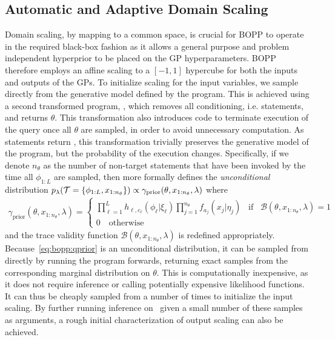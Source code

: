 
\subsection{Automatic and Adaptive Domain Scaling}
\label{sec:bopp:domain}

Domain scaling, by mapping to a common space, is crucial for BOPP to operate in the required black-box fashion as it allows a general purpose and problem independent hyperprior to be placed on the GP hyperparameters.  BOPP therefore employs an affine scaling to a $[-1,1]$ hypercube for both the inputs and outputs of the GPs.  To initialize scaling for the input variables, we sample directly from the generative model defined by the program. %
This is achieved using a second transformed program, \qprior, which removes all conditioning, i.e. \observe statements, and returns $\theta$.  This transformation also introduces code to terminate execution of the query once all $\theta$ are sampled, in order to avoid unnecessary computation.
As \observe statements return , this transformation trivially preserves the generative model of the program, 
but the probability of the execution changes. Specifically, if we denote $n_{\theta}$ as the number of non-target \sample 
statements that have been invoked by the time all $\phi_{1:L}$ are sampled, then \qprior more formally defines the
\emph{unconditional} distribution $p_{\lambda}(\mathcal{T} = \{\phi_{1:L},x_{1:n_{\theta}}\}) \propto 
\gamma_{\text{prior}}(\theta,x_{1:n_{\theta}},\lambda)$ where
\begin{align}
\label{eq:bopp:qprior}
\gamma_{\text{prior}}(\theta,x_{1:n_{\theta}},\lambda)= \begin{cases}
\prod_{\ell=1}^{L}
h_{\ell,c_{\ell}} (\phi_{\ell} | \xi_{\ell})
\prod_{j=1}^{n_{\theta}} 
f_{a_j}(x_j | \eta_j) \;\;\; \text{if} \;\;\; \mathcal{B}(\theta,x_{1:n_\theta},\lambda)=1 \\
0 \quad \text{otherwise}
\end{cases}
\end{align}
and the trace validity function $\mathcal{B}(\theta,x_{1:n_\theta},\lambda)$ is redefined appropriately.
Because~\eqref{eq:bopp:qprior} is an unconditional distribution, it can be sampled from directly by
running the program forwards, returning exact samples from the corresponding marginal distribution on $\theta$.
This is computationally inexpensive, as it does not require inference or calling potentially expensive 
likelihood functions.  It can thus be cheaply sampled from a number of times to initialize the input scaling.
By further running inference on \qmarg~given a small number of these samples as arguments, a rough initial characterization of output scaling can also be achieved.

